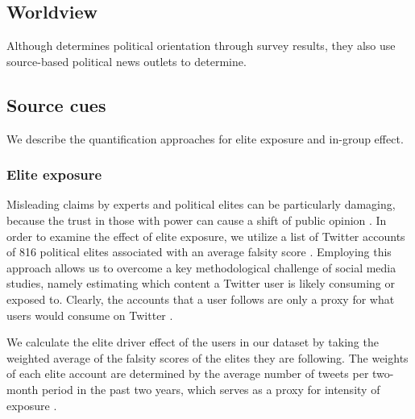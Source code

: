 \documentclass[
10pt, %
a4paper, %
oneside, %
headinclude,footinclude, %
] {book}%
\begin{document}
\subsection{Worldview}


Although \cite{osmundsen2021partisan} determines political orientation through survey results, they also use source-based political  news outlets to determine.






\subsection{Source cues}





We describe the quantification approaches for elite exposure and in-group effect. 

\subsubsection{Elite exposure} \label{sec:elite_exposure}


Misleading claims by experts and political elites can be particularly damaging, because the trust in those with power can cause a shift of public opinion \citep{brulle2012shifting}. In order to examine the effect of elite exposure, we utilize a list of Twitter accounts of 816 political elites associated with an average falsity score \citep{mosleh2021elites}. Employing this approach allows us to overcome a key methodological challenge of social media studies, namely estimating which content a Twitter user is likely consuming or exposed to. Clearly, the accounts that a user follows are only a proxy for what users would consume on Twitter \citep{mosleh2021elites}.

We calculate the elite driver effect of the users in our dataset by taking the weighted average of the falsity scores of the elites they are following. The weights of each elite account are determined by the average number of tweets per two-month period in the past two years, which serves as a proxy for intensity of exposure \citep{mosleh2021elites}. 
\end{document}
